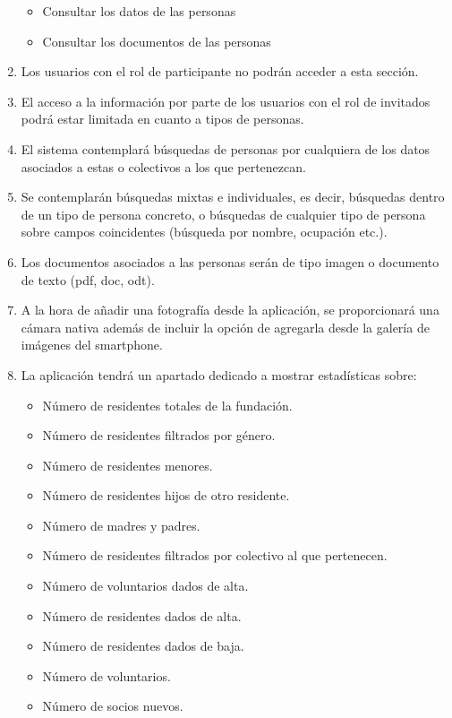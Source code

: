 \begin{enumerate}[start=9,label={RF-\arabic*.}]
\begin{itemize}
            \item Consultar los datos de las personas
            \item Consultar los documentos de las personas
        \end{itemize}
    \item Los usuarios con el rol de participante no podrán acceder a esta sección.
    \item El acceso a la información por parte de los usuarios con el rol de invitados podrá estar limitada en cuanto a tipos de personas.
    \item El sistema contemplará búsquedas de personas por cualquiera de los datos asociados a estas o colectivos a los que pertenezcan.
    \item Se contemplarán búsquedas mixtas e individuales, es decir, búsquedas dentro de un tipo de persona concreto, o búsquedas de cualquier tipo de persona sobre campos coincidentes (búsqueda por nombre, ocupación etc.).
    \item Los documentos asociados a las personas serán de tipo imagen o documento de texto (pdf, doc, odt).
    \item A la hora de añadir una fotografía desde la aplicación, se proporcionará una cámara nativa además de incluir la opción de agregarla desde la galería de imágenes del smartphone.
    \item \label{rf-es-personas} La aplicación tendrá un apartado dedicado a mostrar estadísticas sobre:
        \begin{itemize}
            \item Número de residentes totales de la fundación.
            \item Número de residentes filtrados por género.
            \item Número de residentes menores.
            \item Número de residentes hijos de otro residente.
            \item Número de madres y padres.
            \item Número de residentes filtrados por colectivo al que pertenecen.
            \item Número de voluntarios dados de alta.
            \item Número de residentes dados de alta.
            \item Número de residentes dados de baja.
            \item Número de voluntarios.
            \item Número de socios nuevos.

\end{itemize}
\end{enumerate}
